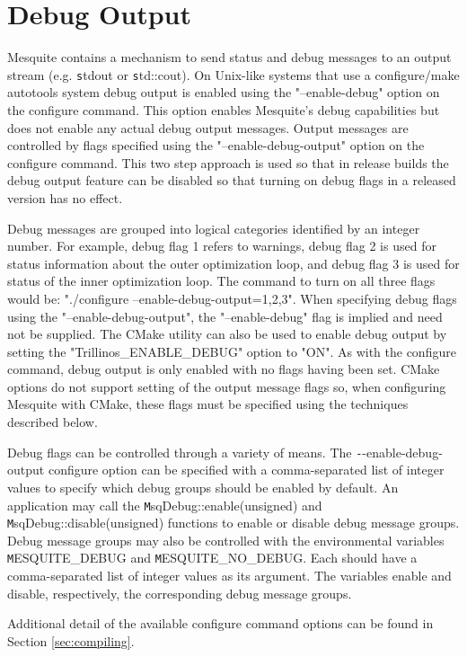 \section{Debug Output}

Mesquite contains a mechanism to send status and debug messages to an output stream (e.g. {\texttt stdout} or {\texttt std::cout}).  On Unix-like systems that use a configure/make autotools system debug output is enabled using the "--enable-debug" option on the configure command. This option enables Mesquite's debug capabilities but does not enable any actual debug output messages.  Output messages are controlled by flags specified using the "--enable-debug-output" option on the configure command.  This two step approach is used so that in release builds the debug output feature can be disabled so that turning on debug flags in a released version has no effect.

  Debug messages are grouped into logical categories identified by an integer number.  For example, debug flag 1 refers to warnings, debug flag 2 is used for status information about the outer optimization loop, and debug flag 3 is used for status of the inner optimization loop. The command to turn on all three flags would be: "./configure --enable-debug-output=1,2,3".  When specifying debug flags using the "--enable-debug-output", the "--enable-debug" flag is implied and need not be supplied. The CMake utility can also be used to enable debug output by setting the "Trillinos\_ENABLE\_DEBUG" option to "ON". As with the configure command, debug output is only enabled with no flags having been set. CMake options do not support setting of the output message flags so, when configuring Mesquite with CMake, these flags must be specified using the techniques described below.

Debug flags can be controlled through a variety of means.  The {\texttt --enable-debug-output} configure option can be specified with a comma-separated list of integer values to specify which debug groups should be enabled by default.  An application may call the {\texttt MsqDebug::enable(unsigned)} and {\texttt MsqDebug::disable(unsigned)} functions to enable or disable debug message groups.  Debug message groups may also be controlled with the environmental variables {\texttt MESQUITE\_DEBUG} and {\texttt MESQUITE\_NO\_DEBUG}.	Each should have a comma-separated list of integer values as its argument.  The variables enable and disable, respectively, the corresponding debug message groups.

Additional detail of the available configure command options can be found in Section \ref{sec:compiling}.

